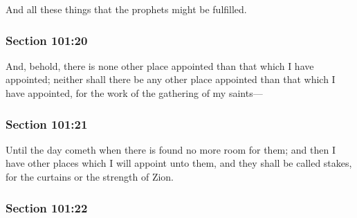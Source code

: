 		And all these things that the prophets might be fulfilled.


	\subsubsection{Section 101:20} %
		\label{DC101-20}

		And, behold, there is none other place appointed than that which I have appointed; neither shall there be any other place appointed than that which I have appointed, for the work of the gathering of my saints---


	\subsubsection{Section 101:21} %
		\label{DC101-21}

		Until the day cometh when there is found no more room for them; and then I have other places which I will appoint unto them, and they shall be called stakes, for the curtains or the strength of Zion.


	\subsubsection{Section 101:22} %
		\label{DC101-22}

